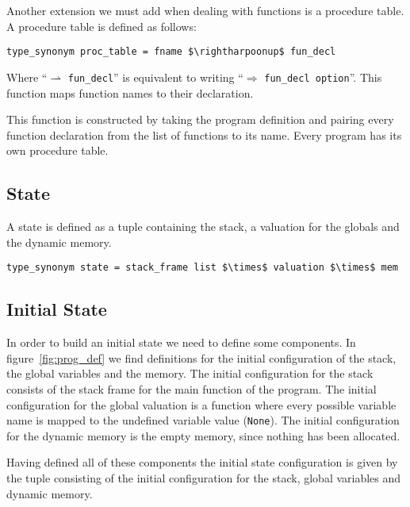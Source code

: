 Another extension we must add when dealing with functions is a procedure table.
A procedure table is defined as follows:

\begin{lstlisting}[mathescape=true, frame=single]
type_synonym proc_table = fname $\rightharpoonup$ fun_decl
\end{lstlisting}

Where ``$\rightharpoonup$ \verb|fun_decl|'' is equivalent to writing ``$\Rightarrow$ \verb|fun_decl option|''.
This function maps function names to their declaration.

This function is constructed by taking the program definition and pairing every function declaration from the list of functions to its name.
Every program has its own procedure table.


\subsection{State}\label{subsection:state}

A state is defined as a tuple containing the stack, a valuation for the globals and the dynamic memory.

\begin{lstlisting}[mathescape=true, frame=single]
type_synonym state = stack_frame list $\times$ valuation $\times$ mem
\end{lstlisting}

\subsection{Initial State}\label{subsection:initial_state}

In order to build an initial state we need to define some components.
In figure~\ref{fig:prog_def} we find definitions for the initial configuration of the stack, the global variables and the memory.
The initial configuration for the stack consists of the stack frame for the main function of the program.
The initial configuration for the global valuation is a function where every possible variable name is mapped to the undefined variable value (\verb|None|).
The initial configuration for the dynamic memory is the empty memory, since nothing has been allocated.

Having defined all of these components the initial state configuration is given by the tuple consisting of the initial configuration for the stack, global variables and dynamic memory.


